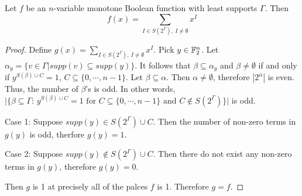 \begin{theorem}
  Let $f$ be an $n$-variable monotone Boolean function with least supports
  $\Gamma$. Then
  \begin{equation}
    f(x)=\sum_{I\in S(2^\Gamma),\ I\not=\emptyset} x^I
  \end{equation}
\end{theorem}

\begin{proof}
  \par Define $g(x)=\sum_{I\in S(2^\Gamma),\ I\not=\emptyset}x^I$.
  Pick $y\in\mathbb{F}_2^n$. Let $\alpha_y=\{v\in\Gamma|
  supp(v)\subseteq supp(y)\}$. It follows that $\beta\subseteq\alpha_y$ and
  $\beta\not=\emptyset$ if and only if $y^{S(\beta) \cup C}=1$,
  $C\subseteq\{0,\cdots,n-1\}$. Let $\beta\subseteq\alpha$. Then
  $\alpha\not=\emptyset$, therefore $|2^\alpha|$ is even. Thus, the number
  of $\beta$'s is odd. In other words,
  $\lvert\{\beta\subseteq\Gamma\text{: } y^{S(\beta)\cup C}=1
  \text{ for }C\subseteq\{0,\cdots,n-1\}\text{ and }
  C\not\in S(2^\Gamma)\}\rvert$ is odd.

  \par Case 1: Suppose $supp(y)\in S(2^\Gamma)\cup C$. Then the number of
  non-zero terms in $g(y)$ is odd, therfore $g(y)=1$.

  \par Case 2: Suppose $supp(y)\not\in S(2^\Gamma)\cup C$. Then there do not
  exist any non-zero terms in $g(y)$, therefore $g(y)=0$.

  \par Then $g$ is 1 at precisely all of the palces $f$ is 1. Therefore
  $g=f$.
\end{proof}


